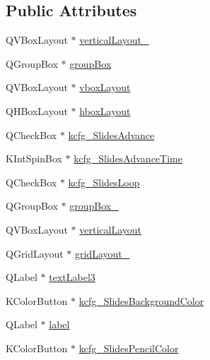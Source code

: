 \subsection*{Public Attributes}
\begin{DoxyCompactItemize}
\item 
Q\+V\+Box\+Layout $\ast$ \hyperlink{classUi__DlgPresentationBase_a3a84b15d28c24f8e1ae84d6c5c322290}{vertical\+Layout\+\_}
\item 
Q\+Group\+Box $\ast$ \hyperlink{classUi__DlgPresentationBase_a32e91831bba9e18b1bd040f092d18f7a}{group\+Box}
\item 
Q\+V\+Box\+Layout $\ast$ \hyperlink{classUi__DlgPresentationBase_abe419761379b787b35d2508302b75d1b}{vbox\+Layout}
\item 
Q\+H\+Box\+Layout $\ast$ \hyperlink{classUi__DlgPresentationBase_a768dd80243404f4b784802baae0d8b12}{hbox\+Layout}
\item 
Q\+Check\+Box $\ast$ \hyperlink{classUi__DlgPresentationBase_a0c1bde315c60ff1727e7b00df3523775}{kcfg\+\_\+\+Slides\+Advance}
\item 
K\+Int\+Spin\+Box $\ast$ \hyperlink{classUi__DlgPresentationBase_aba7f1b1ba7c742636c1f2e306001cb3a}{kcfg\+\_\+\+Slides\+Advance\+Time}
\item 
Q\+Check\+Box $\ast$ \hyperlink{classUi__DlgPresentationBase_a4bce7ac09466e7c37491950385741fa5}{kcfg\+\_\+\+Slides\+Loop}
\item 
Q\+Group\+Box $\ast$ \hyperlink{classUi__DlgPresentationBase_a74ff79cdf30be7fcd1d8a52488d14bbf}{group\+Box\+\_}
\item 
Q\+V\+Box\+Layout $\ast$ \hyperlink{classUi__DlgPresentationBase_a950c7e7e9d1c97a83bdce43745d2bb66}{vertical\+Layout}
\item 
Q\+Grid\+Layout $\ast$ \hyperlink{classUi__DlgPresentationBase_a0c291abc35eac2e0497a5c2f1187f8cc}{grid\+Layout\+\_}
\item 
Q\+Label $\ast$ \hyperlink{classUi__DlgPresentationBase_ae5ef2f22ad09c5290e989c3979c7009f}{text\+Label3}
\item 
K\+Color\+Button $\ast$ \hyperlink{classUi__DlgPresentationBase_aecb1ed8002c11e492aefffaf85263982}{kcfg\+\_\+\+Slides\+Background\+Color}
\item 
Q\+Label $\ast$ \hyperlink{classUi__DlgPresentationBase_ae5123efd7c909bb49d9f9e1252f807e0}{label}
\item 
K\+Color\+Button $\ast$ \hyperlink{classUi__DlgPresentationBase_a7ee75f80ae8dc535a43d18fe930aa27b}{kcfg\+\_\+\+Slides\+Pencil\+Color}
\item 

\end{DoxyCompactItemize}
